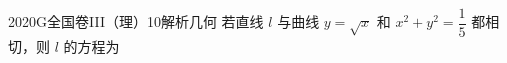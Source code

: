 
\begin{problem}{2020}{G}{全国卷III（理）}{10}{解析几何}
若直线 $ l $ 与曲线 $ y = \sqrt{x} $ 和 $ x^2 + y^2 = \dfrac{1}{5} $ 都相切，则 $ l $ 的方程为
\begin{choices}
\end{choices}
\end{problem}

\begin{answer}

\end{answer}

\begin{solutions}

\end{solutions}